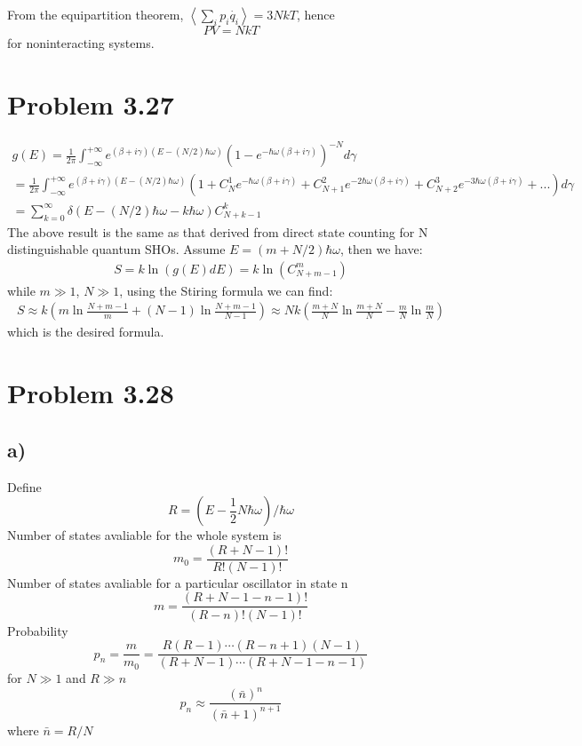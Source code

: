 \documentclass{article}
\begin{document}
	From the equipartition theorem, $\left<\sum_i p_i \dot{q_i} \right> = 3NkT  $, hence
	\begin{equation*}
		PV=NkT
	\end{equation*}
	for noninteracting systems.
\section*{Problem 3.27}
\begin{eqnarray*}
g(E)=\frac{1}{2 \pi}\int_{-\infty}^{+\infty} e^{(\beta +i\gamma)(E-(N/2)\hbar\omega)}(1-e^{-\hbar\omega(\beta +i\gamma)})^{-N}d\gamma  \qquad \qquad \qquad \qquad \qquad \qquad \qquad \qquad \qquad \quad\\
=\frac{1}{2 \pi}\int_{-\infty}^{+\infty} e^{(\beta +i\gamma)(E-(N/2)\hbar\omega)}(1+C_N^1e^{-\hbar\omega(\beta +i\gamma)}+C_{N+1}^2e^{-2\hbar\omega(\beta +i\gamma)}+C_{N+2}^3e^{-3\hbar\omega(\beta +i\gamma)}+...)d\gamma  \\
=\sum_{k=0}^{\infty}\delta(E-(N/2)\hbar\omega-k\hbar\omega)C_{N+k-1}^{k}  \qquad \qquad \qquad \qquad \qquad \qquad \qquad \qquad \qquad \qquad \qquad \qquad \qquad
\end{eqnarray*}
The above result is the same as that derived from direct state counting for N distinguishable quantum SHOs. Assume $ E=(m+N/2)\hbar\omega $, then we have:
\begin{eqnarray*}
S=k\ln(g(E)dE)=k\ln(C_{N+m-1}^m)
\end{eqnarray*}
while $m\gg1$, $N\gg1$, using the Stiring formula we can find:
\begin{eqnarray*}
S\approx k(m\ln{\frac{N+m-1}{m}}+(N-1)\ln{\frac{N+m-1}{N-1}})\approx Nk(\frac{m+N}{N}\ln{\frac{m+N}{N}}-\frac{m}{N}\ln{\frac{m}{N}})
\end{eqnarray*}
which is the desired formula.
\section*{Problem 3.28}
\subsection*{a)}
Define
\begin{equation*}
R=\left(E-\frac{1}{2}N\hbar\omega\right)\Bigg/\hbar\omega
\end{equation*}
Number of states avaliable for the whole system is
\begin{equation*}
m_0=\frac{(R+N-1)!}{R!(N-1)!}
\end{equation*}
Number of states avaliable for a particular oscillator in state n
\begin{equation*}
m=\frac{(R+N-1-n-1)!}{(R-n)!(N-1)!}
\end{equation*}
Probability
\begin{equation*}
p_n=\frac{m}{m_0}=\frac{R(R-1)\cdots(R-n+1)(N-1)}{(R+N-1)\cdots(R+N-1-n-1)}
\end{equation*}
for $N\gg 1$ and $R\gg n$
\begin{equation*}
p_n\approx \frac{(\bar n)^n}{(\bar n+1)^{n+1}}
\end{equation*}
where $\bar n=R/N$
\end{document}
